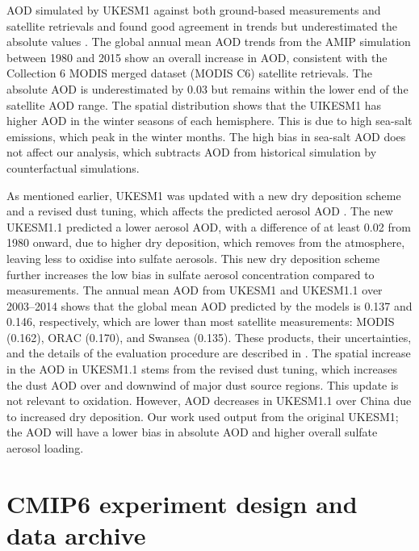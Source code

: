 AOD simulated by UKESM1 against both ground-based measurements and satellite retrievals and found good agreement in trends but underestimated the absolute values \citep{mulcahyDescriptionEvaluationAerosol2020}. The global annual mean AOD trends from the AMIP simulation between 1980 and 2015 show an overall increase in AOD, consistent with the Collection 6 MODIS merged dataset (MODIS C6) satellite retrievals. The absolute AOD is underestimated by 0.03 but remains within the lower end of the satellite AOD range. The spatial distribution shows that the UIKESM1 has higher AOD in the winter seasons of each hemisphere. This is due to high sea-salt emissions, which peak in the winter months. The high bias in sea-salt AOD does not affect our analysis, which subtracts AOD from historical simulation by counterfactual simulations.

As mentioned earlier, UKESM1 was updated with a new dry deposition scheme and a revised dust tuning, which affects the predicted aerosol AOD \citep{mulcahyUKESM11DevelopmentEvaluation2023}. The new UKESM1.1 predicted a lower aerosol AOD, with a difference of at least 0.02 from 1980 onward, due to higher  dry deposition, which removes  from the atmosphere, leaving less to oxidise into sulfate aerosols. This new dry deposition scheme further increases the low bias in sulfate aerosol concentration compared to measurements. The annual mean AOD from UKESM1 and UKESM1.1 over 2003--2014 shows that the global mean AOD predicted by the models is 0.137 and 0.146, respectively, which are lower than most satellite measurements: MODIS (0.162), ORAC (0.170), and Swansea (0.135). These products, their uncertainties, and the details of the evaluation procedure are described in \citet{mulcahyDescriptionEvaluationAerosol2020}. The spatial increase in the AOD in UKESM1.1 stems from the revised dust tuning, which increases the dust AOD over and downwind of major dust source regions. This update is not relevant to  oxidation. However, AOD decreases in UKESM1.1 over China due to increased  dry deposition. Our work used output from the original UKESM1; the AOD will have a lower bias in absolute AOD and higher overall sulfate aerosol loading.

\section{CMIP6 experiment design and data archive}
\label{sec:2.CMIP6}

